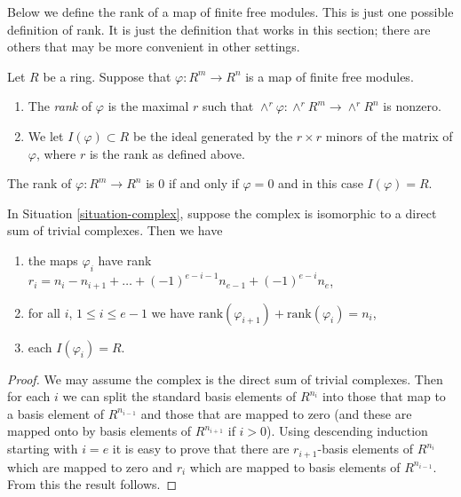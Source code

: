 \noindent
Below we define the rank of a map of finite free modules.
This is just one possible definition of rank. It
is just the definition that works in this section; there
are others that may be more convenient in other settings.

\begin{definition}
\label{definition-rank}
Let $R$ be a ring. Suppose that $\varphi : R^m \to R^n$ is a map
of finite free modules.
\begin{enumerate}
\item The {\it rank} of $\varphi$ is the maximal $r$ such that
$\wedge^r \varphi : \wedge^r R^m \to \wedge^r R^n$ is nonzero.
\item We let $I(\varphi) \subset R$ be the ideal generated by
the $r \times r$ minors of the matrix of $\varphi$, where $r$
is the rank as defined above.
\end{enumerate}
\end{definition}

\noindent
The rank of $\varphi : R^m \to R^n$ is $0$
if and only if $\varphi = 0$ and in this case $I(\varphi) = R$.

\begin{lemma}
\label{lemma-trivial-case-exact}
In Situation \ref{situation-complex}, suppose the complex is
isomorphic to a direct sum of trivial complexes. Then
we have
\begin{enumerate}
\item the maps $\varphi_i$ have rank
$r_i = n_i - n_{i + 1} + \ldots + (-1)^{e-i-1} n_{e-1} + (-1)^{e-i} n_e$,
\item for all $i$, $1 \leq i \leq e - 1$ we have
$\text{rank}(\varphi_{i + 1}) + \text{rank}(\varphi_i) = n_i$,
\item each $I(\varphi_i) = R$.
\end{enumerate}
\end{lemma}

\begin{proof}
We may assume the complex is the direct sum of trivial
complexes. Then for each $i$ we can split the standard basis
elements of $R^{n_i}$ into those that map to a basis element
of $R^{n_{i-1}}$ and those that are mapped to zero (and these
are mapped onto by basis elements of $R^{n_{i + 1}}$ if $i > 0$).
Using descending
induction starting with $i = e$ it is easy to prove that there
are $r_{i + 1}$-basis elements of $R^{n_i}$ which are mapped
to zero and $r_i$ which are mapped to basis elements of
$R^{n_{i-1}}$. From this the result follows.
\end{proof}

